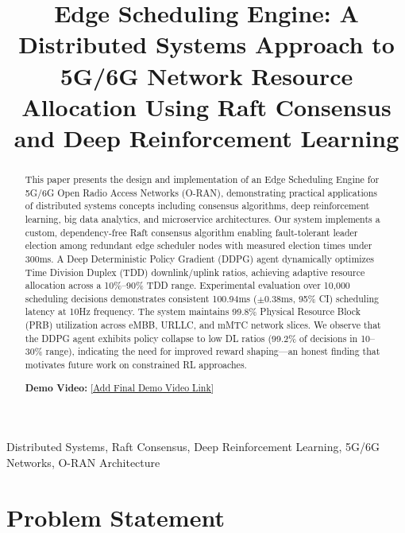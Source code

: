 \documentclass[journal]{IEEEtran}
\begin{document}
\title{Edge Scheduling Engine: A Distributed Systems Approach to 5G/6G Network Resource Allocation Using Raft Consensus and Deep Reinforcement Learning}

\author{
}

\maketitle

\begin{abstract}
This paper presents the design and implementation of an Edge Scheduling Engine for 5G/6G Open Radio Access Networks (O-RAN), demonstrating practical applications of distributed systems concepts including consensus algorithms, deep reinforcement learning, big data analytics, and microservice architectures. Our system implements a custom, dependency-free Raft consensus algorithm enabling fault-tolerant leader election among redundant edge scheduler nodes with measured election times under 300ms. A Deep Deterministic Policy Gradient (DDPG) agent dynamically optimizes Time Division Duplex (TDD) downlink/uplink ratios, achieving adaptive resource allocation across a 10\%--90\% TDD range. Experimental evaluation over 10,000 scheduling decisions demonstrates consistent 100.94ms ($\pm$0.38ms, 95\% CI) scheduling latency at 10Hz frequency. The system maintains 99.8\% Physical Resource Block (PRB) utilization across eMBB, URLLC, and mMTC network slices. We observe that the DDPG agent exhibits policy collapse to low DL ratios (99.2\% of decisions in 10--30\% range), indicating the need for improved reward shaping---an honest finding that motivates future work on constrained RL approaches.

\textbf{Demo Video:} \url{[Add Final Demo Video Link]}
\end{abstract}

\begin{IEEEkeywords}
Distributed Systems, Raft Consensus, Deep Reinforcement Learning, 5G/6G Networks, O-RAN Architecture
\end{IEEEkeywords}

\IEEEpeerreviewmaketitle

\section{Problem Statement}
\end{document}
